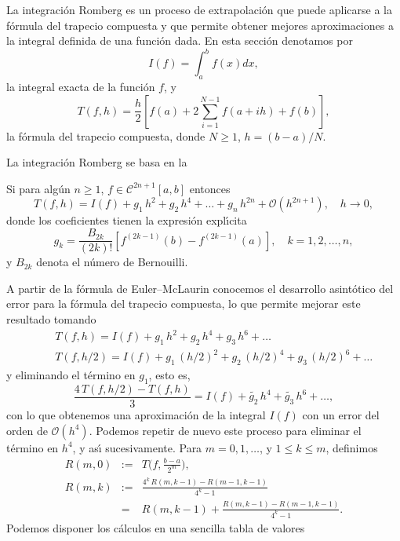 La integraci\'on Romberg es un proceso de extrapolaci\'on que puede aplicarse a la f\'ormula del trapecio compuesta y que permite obtener mejores aproximaciones a la integral definida de una funci\'on dada. En esta secci\'on denotamos por
$$I(f) =  \int_a^b\!\! f(x)dx,$$
la integral exacta de la funci\'on $f$, y 
$$T(f,h) = \frac{h}{2}\left[f(a) + 2\!\!\sum_{i=1}^{N-1} f(a+ih) + f(b) \right],$$
la f\'ormula del trapecio compuesta, donde $N\ge 1$, $h = (b-a)/N.$

La integraci\'on Romberg se basa en la
\begin{thm}
Si para alg\'un $n\ge 1$, $f \in \mathcal{C}^{2n+1}[a,b]$ entonces 
$$T(f,h) = I(f) + g_1\,h^2 + g_2\,h^4 + \ldots + g_n\,h^{2n} + \mathcal{O}(h^{2n+1}), \quad h\to 0, $$
donde los coeficientes tienen la expresi\'on expl\'{\i}cita
$$g_k = \frac{B_{2k}}{(2k)!}\left[f^{(2k-1)}(b) - f^{(2k-1)}(a)\right], \quad k=1, 2, \ldots, n,$$
y $B_{2k}$ denota el n\'umero de Bernouilli.
\end{thm}
A partir de la f\'ormula de Euler--McLaurin conocemos el desarrollo asint\'otico del error para la f\'ormula del trapecio compuesta, lo que permite mejorar este resultado tomando
\begin{eqnarray*} 
&~& T(f,h) = I(f) + g_1\,h^2 + g_2\,h^4 + g_3\,h^6 + \ldots \\
&~& T(f,h/2) = I(f) + g_1\,(h/2)^2 + g_2\,(h/2)^4 + g_3\,(h/2)^6+ \ldots
\end{eqnarray*}
y eliminando el t\'ermino en $g_1$, esto es, 
$$\frac{4\,T(f,h/2) - T(f,h)}{3} = I(f) + \tilde{g_2}\,h^4 + \tilde{g_3}\,h^6+ \ldots,$$
con lo que obtenemos una aproximaci\'on de la integral $I(f)$ con un error del orden de $\mathcal{O}(h^4)$. Podemos repetir de nuevo este proceso para eliminar el t\'ermino en $h^4$, y as\'{\i} sucesivamente. Para $m=0, 1, \ldots$, y $1\le k\le m$, definimos
\begin{eqnarray*}
R(m,0) &:=& T\big(f,\frac{b-a}{2^m}\big),\\
R(m,k) &:=& \frac{4^k\,R(m,k-1) - R(m-1,k-1)}{4^k - 1}\\
               &=& R(m,k-1) + \frac{R(m,k-1) - R(m-1,k-1)}{4^k - 1}.
\end{eqnarray*}
Podemos disponer los c\'alculos en una sencilla tabla de valores
